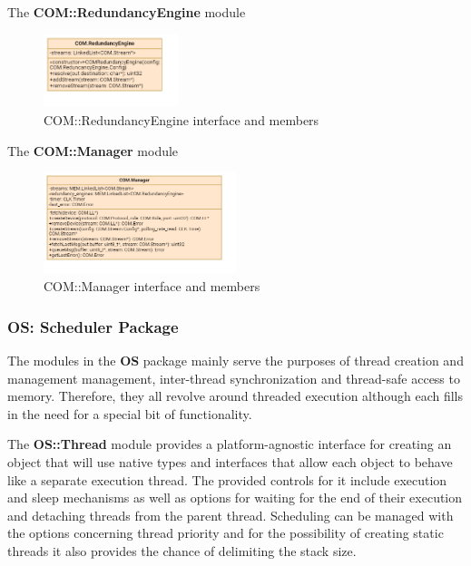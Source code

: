 The \textbf{COM::RedundancyEngine} module 

\begin{figure}[H]
	\centering
	\includegraphics[width=0.35\textwidth]{./img/navig-class-redundancy-engine.png}
	\caption {COM::RedundancyEngine interface and members}
	\label{fig:navig-class-redundancy-engine}
	\end{figure}


The \textbf{COM::Manager} module 
	
\begin{figure}[H]
	\centering
	\includegraphics[width=0.5\textwidth]{./img/navig-class-manager.png}
	\caption {COM::Manager interface and members}
	\label{fig:navig-class-manager}
	\end{figure}



\subsubsection{OS: Scheduler Package}
\label{sec:osPack}
The modules in the \textbf{OS} package mainly serve the purposes of thread creation and management management, inter-thread synchronization and thread-safe access to memory. Therefore, they all revolve around threaded execution although each fills in the need for a special bit of functionality.

The \textbf{OS::Thread} module provides a platform-agnostic interface for creating an object that will use native types and interfaces that allow each object to behave like a separate execution thread. The provided controls for it include execution and sleep mechanisms as well as options for waiting for the end of their execution and detaching threads from the parent thread. Scheduling can be managed with the options concerning thread priority and for the possibility of creating static threads it also provides the chance of delimiting the stack size. 

